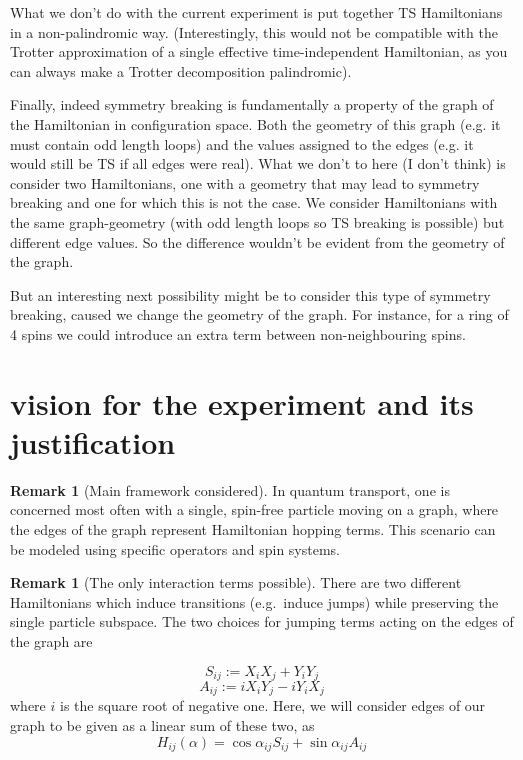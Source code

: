 \documentclass[aps,pra,12pt,nofootinbib,superscriptaddress,longbibliography,showpacs]{revtex4-1}
\theoremstyle{plain}
\theoremstyle{definition}
\newtheorem{remark}[theorem]{Remark}
\begin{document}
What we don't do with the current experiment is put together TS Hamiltonians in a non-palindromic way. (Interestingly, this would not be compatible with the Trotter approximation of a single effective time-independent Hamiltonian, as you can always make a Trotter decomposition palindromic).

Finally, indeed symmetry breaking is fundamentally a property of the graph of the Hamiltonian in configuration space. Both the geometry of this graph (e.g. it must contain odd length loops) and the values assigned to the edges (e.g. it would still be TS if all edges were real). What we don't to here (I don't think) is consider two Hamiltonians, one with a geometry that may lead to symmetry breaking and one for which this is not the case. We consider Hamiltonians with the same graph-geometry (with odd length loops so TS breaking is possible) but different edge values. So the difference wouldn't be evident from the geometry of the graph.

But an interesting next possibility might be to consider this type of symmetry breaking, caused we change the geometry of the graph. For instance, for a ring of 4 spins we could introduce an extra term between non-neighbouring spins.


\section{vision for the experiment and its justification} 

\begin{remark}[Main framework considered] 
In quantum transport, one is concerned most often with a
single, spin-free particle moving on a
graph, where the edges of the graph represent Hamiltonian hopping terms.  This
scenario can be modeled using specific operators and spin systems.   
\end{remark}

\begin{remark}[The only interaction terms possible] 
 There are two different Hamiltonians which induce transitions
(e.g.~induce jumps) while preserving the single particle subspace.  The two
choices for jumping terms acting on the edges of the graph are 

$$ 
S_{ij} := X_iX_j + Y_iY_j 
$$ 
$$ 
A_{ij} := iX_iY_j - iY_iX_j 
$$ 
where $i$ is the square root of negative one.  
Here, we will consider edges of our graph to be given as a linear sum of these
two, as
\begin{equation}
 H_{ij}(\alpha) = \cos \alpha_{ij} S_{ij} + \sin \alpha_{ij} A_{ij} 
\end{equation}
\end{remark}
\end{document}
